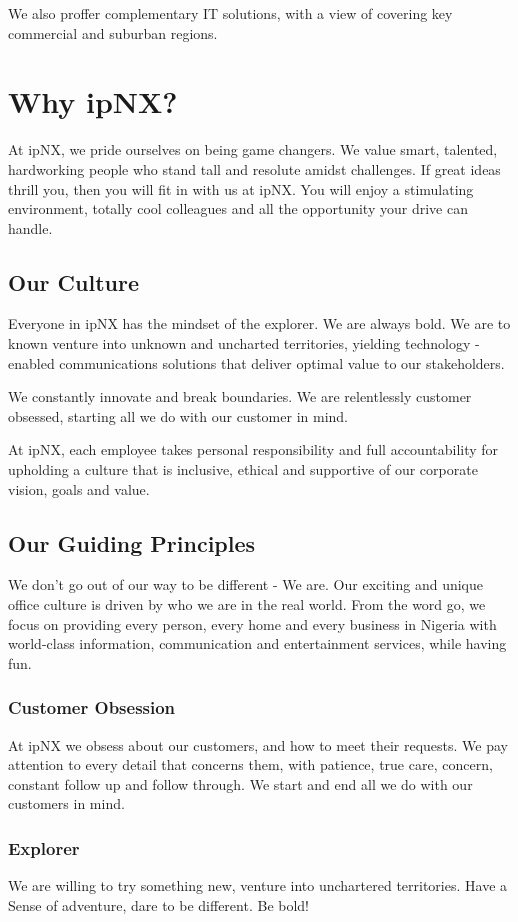 We also proffer complementary IT solutions, with a view of covering key commercial and suburban regions.
\section{Why ipNX?}
At ipNX, we pride ourselves on being game changers. We value smart, talented, hardworking people who stand tall and resolute amidst challenges. If great ideas thrill you, then you will fit in with us at ipNX. You will enjoy a stimulating environment, totally cool colleagues and all the opportunity your drive can handle.
\subsection{Our Culture}
Everyone in ipNX has the mindset of the explorer. We are always bold. We are to known venture into unknown and uncharted territories, yielding technology - enabled communications solutions that deliver optimal value to our stakeholders.

We constantly innovate and break boundaries. We are relentlessly customer obsessed, starting all we do with our customer in mind.

At ipNX, each employee takes personal responsibility and full accountability for upholding a culture that is inclusive, ethical and supportive of our corporate vision, goals and value.
\subsection{Our Guiding Principles}
We don't go out of our way to be different - We are. Our exciting and unique office culture is driven by who we are in the real world. From the word go, we focus on providing every person, every home and every business in Nigeria with world-class information, communication and entertainment services, while having fun.
\subsubsection{Customer Obsession} At ipNX we obsess about our customers, and how to meet their requests.  We pay attention to every detail that concerns them, with patience, true care, concern, constant follow up and follow through. We start and end all we do with our customers in mind.
\subsubsection{Explorer} We are willing to try something new, venture into unchartered territories. Have a Sense of adventure, dare  to be different. Be bold!
